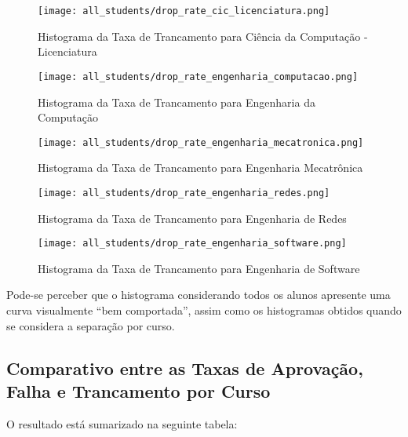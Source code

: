 \begin{figure}[!ht]
    \caption{Histograma da Taxa de Trancamento para Ciência da Computação -
    Licenciatura}
    \centering
    \texttt{[image: all\_students/drop\_rate\_cic\_licenciatura.png]}
    \label{drop_rate_cic_lic}
\end{figure}

\begin{figure}[!ht]
    \caption{Histograma da Taxa de Trancamento para Engenharia da Computação}
    \centering
    \texttt{[image: all\_students/drop\_rate\_engenharia\_computacao.png]}
    \label{drop_rate_eng_comp}
\end{figure}

\begin{figure}[!ht]
    \caption{Histograma da Taxa de Trancamento para Engenharia Mecatrônica}
    \centering
    \texttt{[image: all\_students/drop\_rate\_engenharia\_mecatronica.png]}
    \label{drop_rate_eng_mectr}
\end{figure}

\begin{figure}[!ht]
    \caption{Histograma da Taxa de Trancamento para Engenharia de Redes}
    \centering
    \texttt{[image: all\_students/drop\_rate\_engenharia\_redes.png]}
    \label{drop_rate_eng_redes}
\end{figure}

\begin{figure}[!ht]
    \caption{Histograma da Taxa de Trancamento para Engenharia de Software}
    \centering
    \texttt{[image: all\_students/drop\_rate\_engenharia\_software.png]}
    \label{drop_rate_eng_soft}
\end{figure}

Pode-se perceber que o histograma considerando todos os alunos apresente uma
curva visualmente ``bem comportada'', assim como os histogramas obtidos quando se considera a
separação por curso. \clearpage

\subsection{Comparativo entre as Taxas de Aprovação, Falha e Trancamento por Curso}
O resultado está sumarizado na seguinte tabela: 

